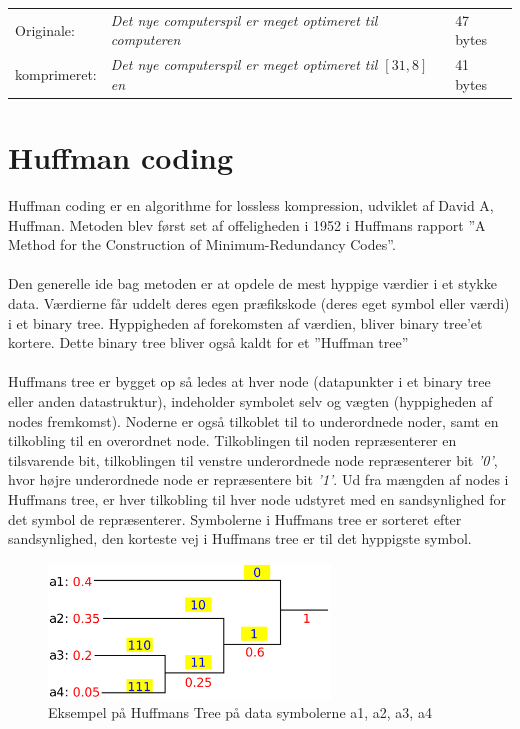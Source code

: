 \documentclass[12pt]{article}
\begin{document}
\begin{tabular}{lll}
  Originale: & \textit{Det nye computerspil er meget optimeret til computeren} & 47 bytes \\
  komprimeret: & \textit{Det nye computerspil er meget optimeret til $[31,8]$en} & 41 bytes
\end{tabular}
\newpage
\section{Huffman coding}
Huffman coding er en algorithme for lossless kompression, udviklet af David A, Huffman. Metoden blev først set af offeligheden i 1952 i Huffmans rapport 
”A Method for the Construction of Minimum-Redundancy Codes”.\cite*{Wiki/Huffman} \\\\
Den generelle ide bag metoden er at opdele de mest hyppige værdier i et stykke data. Værdierne får uddelt deres egen præfikskode (deres eget symbol eller værdi) i et binary tree.
Hyppigheden af forekomsten af værdien, bliver binary tree’et kortere. Dette binary tree bliver også kaldt for et ”Huffman tree”\cite{yt/Huffman} \\\\
Huffmans tree er bygget op så ledes at hver node (datapunkter i et binary tree eller anden datastruktur), indeholder symbolet selv og vægten (hyppigheden af nodes fremkomst). 
Noderne er også tilkoblet til to underordnede noder, samt en tilkobling til en overordnet node. Tilkoblingen til noden repræsenterer en tilsvarende bit, 
tilkoblingen til venstre underordnede node repræsenterer bit \textit{’0’}, hvor højre underordnede node er repræsentere bit \textit{’1’}. Ud fra mængden af nodes i Huffmans tree, er hver tilkobling til hver node udstyret med en 
sandsynlighed for det symbol de repræsenterer. Symbolerne i Huffmans tree er sorteret efter sandsynlighed, den korteste vej i Huffmans tree er til det hyppigste symbol.\\
\begin{figure}[ht]%
  \centering
  \includegraphics[width=7.5cm]{Huffman_coding_example.png}%
  \caption{\centering Eksempel på Huffmans Tree på data symbolerne a1, a2, a3, a4 \cite{Wiki/Huffman}}\label{Huffmans}%
\end{figure}\\
\end{document}
